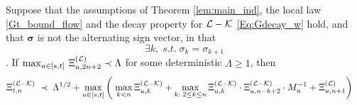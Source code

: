 \begin{lemma}\label{lem:STOeq_NQ}  
Suppose that the   assumptions of  Theorem \ref{lem:main_ind},  the local law \eqref{Gt_bound_flow} and the decay property for $\cal L-\cal K$ \eqref{Eq:Gdecay_w} hold, and that $\boldsymbol{\sigma}$ is not the alternating sign vector, in that
\begin{equation}\label{NALsigm}
    \exists k,\; s.t.\; \sigma_k=\sigma_{k+1}
\end{equation}. 
If $\max_{u\in [s,t]}\, \Xi^{(\cal L)}_{u, {2n+2}}\prec {  \Lambda}$ for some deterministic $ \Lambda \ge 1$, then 
\begin{align}\label{am;asoiuw}
 \Xi^{({\cal L-\cal K})}_{t,n}
 \;\prec\;  &\; { \Lambda}^{1/2}+\max_{u\in [s,t]}
  \left(\; \max_{k<n }\Xi^{({\cal L-\cal K})}_{u,k}+\max_{k:\;2\le k\le n }\Xi^{({\cal L-\cal K})}_{u,k}\cdot \Xi^{({\cal L-\cal K})}_{u,n-k+2}\cdot M_{u}^{-1}+\Xi^{({\cal L})}_{u,n+1}\right)
\end{align}
 
 
\end{lemma}

